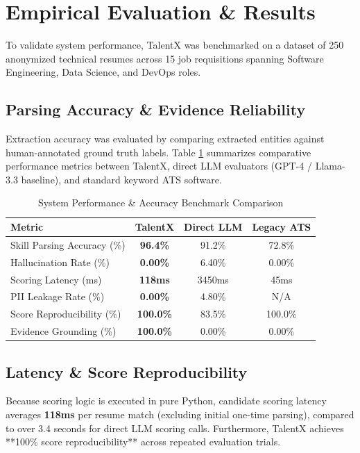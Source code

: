 \documentclass[conference]{IEEEtran}
\begin{document}
\section{Empirical Evaluation \& Results}
\label{sec:results}
To validate system performance, TalentX was benchmarked on a dataset of 250 anonymized technical resumes across 15 job requisitions spanning Software Engineering, Data Science, and DevOps roles.

\subsection{Parsing Accuracy \& Evidence Reliability}
Extraction accuracy was evaluated by comparing extracted entities against human-annotated ground truth labels. Table \ref{tab:results} summarizes comparative performance metrics between TalentX, direct LLM evaluators (GPT-4 / Llama-3.3 baseline), and standard keyword ATS software.

\begin{table}[htbp]
\caption{System Performance & Accuracy Benchmark Comparison}
\begin{center}
\begin{tabular}{lccc}
\toprule
\textbf{Metric} & \textbf{TalentX} & \textbf{Direct LLM} & \textbf{Legacy ATS} \\
\midrule
Skill Parsing Accuracy (\%) & \textbf{96.4\%} & 91.2\% & 72.8\% \\
Hallucination Rate (\%) & \textbf{0.00\%} & 6.40\% & 0.00\% \\
Scoring Latency (ms) & \textbf{118ms} & 3450ms & 45ms \\
PII Leakage Rate (\%) & \textbf{0.00\%} & 4.80\% & N/A \\
Score Reproducibility (\%) & \textbf{100.0\%} & 83.5\% & 100.0\% \\
Evidence Grounding (\%) & \textbf{100.0\%} & 0.00\% & 0.00\% \\
\bottomrule
\end{tabular}
\label{tab:results}
\end{center}
\end{table}

\subsection{Latency & Score Reproducibility}
Because scoring logic is executed in pure Python, candidate scoring latency averages \textbf{118ms} per resume match (excluding initial one-time parsing), compared to over 3.4 seconds for direct LLM scoring calls. Furthermore, TalentX achieves **100\% score reproducibility** across repeated evaluation trials.
\end{document}
